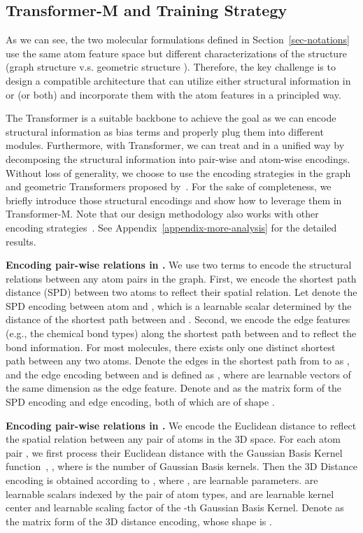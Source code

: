 \documentclass{article} \usepackage[dvipsnames]{xcolor}
\begin{document}
\vspace{-4pt}
\subsection{Transformer-M and Training Strategy}
\label{sec-interaction_encoding}
\vspace{-4pt}
As we can see, the two molecular formulations defined in Section~\ref{sec-notations} use the same atom feature space but different characterizations of the structure (graph structure  v.s. geometric structure ). Therefore, the key challenge is to design a compatible architecture that can utilize either structural information in  or  (or both) and incorporate them with the atom features in a principled way. 

The Transformer is a suitable backbone to achieve the goal as we can encode structural information as bias terms and properly plug them into different modules. Furthermore, with Transformer, we can treat  and  in a unified way by decomposing the structural information into pair-wise and atom-wise encodings. Without loss of generality, we choose to use the encoding strategies in the graph and geometric Transformers proposed by~\citet{ying2021transformers,shi2022benchmarking}. For the sake of completeness, we briefly introduce those structural encodings and show how to leverage them in Transformer-M. Note that our design methodology also works with other encoding strategies~\citep{hussain2022global,park2022grpe, tholke2021equivariant}. See Appendix~\ref{appendix-more-analysis} for the detailed results.  

\textbf{Encoding pair-wise relations in .}\quad 
We use two terms to encode the structural relations between any atom pairs in the graph. First, we encode the shortest path distance (SPD) between two atoms to reflect their spatial relation. Let  denote the SPD encoding between atom  and , which is a learnable scalar determined by the distance of the shortest path between  and . Second, we encode the edge features (e.g., the chemical bond types) along the shortest path between  and  to reflect the bond information. For most molecules, there exists only one distinct shortest path between any two atoms. Denote the edges in the shortest path from  to  as , and the edge encoding between  and  is defined as , where  are learnable vectors of the same dimension as the edge feature. Denote  and  as the matrix form of the SPD encoding and edge encoding, both of which are of shape  .

\textbf{Encoding pair-wise relations in . }
We encode the Euclidean distance to reflect the spatial relation between any pair of atoms in the 3D space. For each atom pair , we first process their Euclidean distance with the Gaussian Basis Kernel function~\citep{scholkopf1997comparing}, , where  is the number of Gaussian Basis kernels. Then the 3D Distance encoding  is obtained according to  , where ,  are learnable parameters.  are learnable scalars indexed by the pair of atom types, and  are learnable kernel center and learnable scaling factor of the -th Gaussian Basis Kernel. Denote  as the matrix form of the 3D distance encoding, whose shape is .
\end{document}
